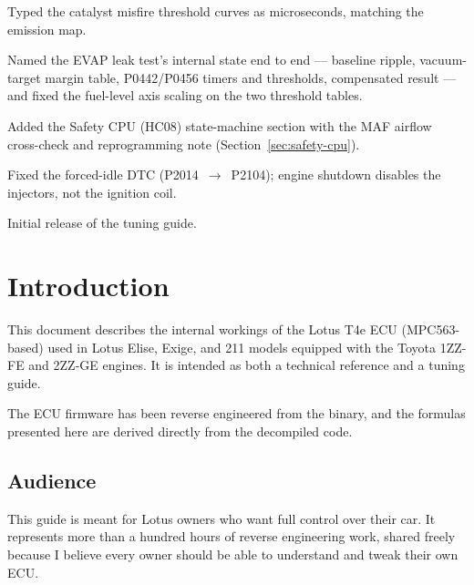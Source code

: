 \documentclass[a4paper,11pt]{article}
\newcommand{\guideversion}{1.2}
\renewcommand{\_}{\oldunderscore\allowbreak}
\begin{document}
\begin{changelog}[title={Change Log}, label={sec:changelog}, simple]
\begin{version}[v={\guideversion}, date={2026-07-20}]
    \item Typed the catalyst misfire threshold curves as microseconds, matching
          the emission map.
    \item Named the EVAP leak test's internal state end to end --- baseline
          ripple, vacuum-target margin table, P0442/P0456 timers and
          thresholds, compensated result --- and fixed the fuel-level axis
          scaling on the two threshold tables.
  \end{version}
  \begin{version}[v={1.1}, date={2026-06-24}]
    \item Added the Safety CPU (HC08) state-machine section with the MAF
          airflow cross-check and reprogramming note (Section~\ref{sec:safety-cpu}).
    \item Fixed the forced-idle DTC (P2014~$\rightarrow$~P2104); engine shutdown
          disables the injectors, not the ignition coil.
  \end{version}
  \begin{version}[v={1.0}, date={2026-03-03}]
    \item Initial release of the tuning guide.
  \end{version}
\end{changelog}

\section{Introduction}

This document describes the internal workings of the Lotus T4e ECU (MPC563-based)
used in Lotus Elise, Exige, and 211 models equipped with the Toyota 1ZZ-FE and
2ZZ-GE engines. It is intended as both a technical reference and a tuning guide.

The ECU firmware has been reverse engineered from the binary, and the formulas
presented here are derived directly from the decompiled code.

\subsection{Audience}

This guide is meant for Lotus owners who want full control over their car.
It represents more than a hundred hours of reverse engineering work, shared
freely because I believe every owner should be able to understand and tweak
their own ECU.
\end{document}
